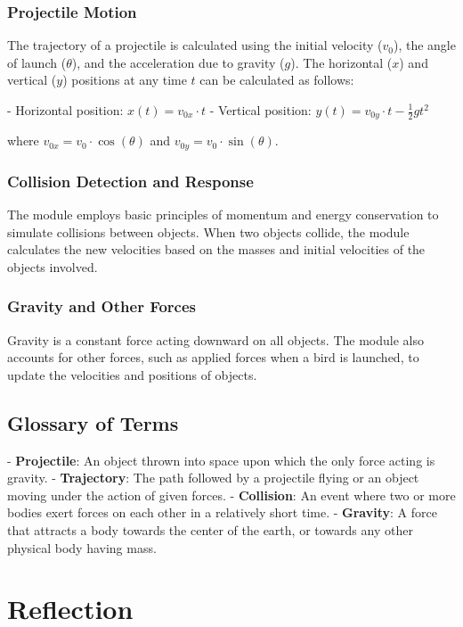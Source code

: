 \documentclass[12pt]{article}
\begin{document}
\subsubsection*{Projectile Motion}

The trajectory of a projectile is calculated using the initial velocity (\(v_0\)), the angle of launch (\(\theta\)), and the acceleration due to gravity (\(g\)). The horizontal (\(x\)) and vertical (\(y\)) positions at any time \(t\) can be calculated as follows:

- Horizontal position: \( x(t) = v_{0x} \cdot t \)
- Vertical position: \( y(t) = v_{0y} \cdot t - \frac{1}{2} g t^2 \)

where \( v_{0x} = v_0 \cdot \cos(\theta) \) and \( v_{0y} = v_0 \cdot \sin(\theta) \).

\subsubsection*{Collision Detection and Response}

The module employs basic principles of momentum and energy conservation to simulate collisions between objects. When two objects collide, the module calculates the new velocities based on the masses and initial velocities of the objects involved.

\subsubsection*{Gravity and Other Forces}

Gravity is a constant force acting downward on all objects. The module also accounts for other forces, such as applied forces when a bird is launched, to update the velocities and positions of objects.

\subsection{Glossary of Terms}

- \textbf{Projectile}: An object thrown into space upon which the only force acting is gravity.
- \textbf{Trajectory}: The path followed by a projectile flying or an object moving under the action of given forces.
- \textbf{Collision}: An event where two or more bodies exert forces on each other in a relatively short time.
- \textbf{Gravity}: A force that attracts a body towards the center of the earth, or towards any other physical body having mass.

\newpage
\section{Reflection}
\end{document}
